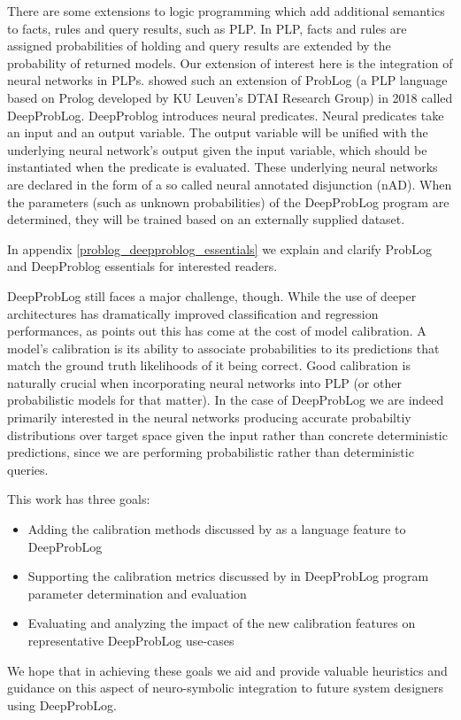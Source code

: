 There are some extensions to logic programming which add additional semantics to facts, rules and query results, such as PLP. In PLP, facts and rules are assigned probabilities of holding and query results are extended by the probability of returned models. Our extension of interest here is the integration of neural networks in PLPs. \cite{manhaeve2018deepproblog} showed such an extension of ProbLog (a PLP language based on Prolog developed by KU Leuven's DTAI Research Group) in 2018 called DeepProbLog. DeepProblog introduces neural predicates. Neural predicates take an input and an output variable. The output variable will be unified with the underlying neural network's output given the input variable, which should be instantiated when the predicate is evaluated. These underlying neural networks are declared in the form of a so called neural annotated disjunction (nAD). When the parameters (such as unknown probabilities) of the DeepProbLog program are determined, they will be trained based on an externally supplied dataset. \par
In appendix \ref{problog_deepproblog_essentials} we explain and clarify ProbLog and DeepProblog essentials for interested readers. \par
DeepProbLog still faces a major challenge, though. While the use of deeper architectures has dramatically improved classification and regression performances, as \cite{guo2017calibration} points out this has come at the cost of model calibration. A model's calibration is its ability to associate probabilities to its predictions that match the ground truth likelihoods of it being correct. Good calibration is naturally crucial when incorporating neural networks into PLP (or other probabilistic models for that matter). In the case of DeepProbLog we are indeed primarily interested in the neural networks producing accurate probabiltiy distributions over target space given the input rather than concrete deterministic predictions, since we are performing probabilistic rather than deterministic queries. \par
This work has three goals:
\begin{itemize}
  \item Adding the calibration methods discussed by \cite{guo2017calibration} as a language feature to DeepProbLog
  \item Supporting the calibration metrics discussed by \cite{guo2017calibration} in DeepProbLog program parameter determination and evaluation
  \item Evaluating and analyzing the impact of the new calibration features on representative DeepProbLog use-cases
\end{itemize}
We hope that in achieving these goals we aid and provide valuable heuristics and guidance on this aspect of neuro-symbolic integration to future system designers using DeepProbLog.
